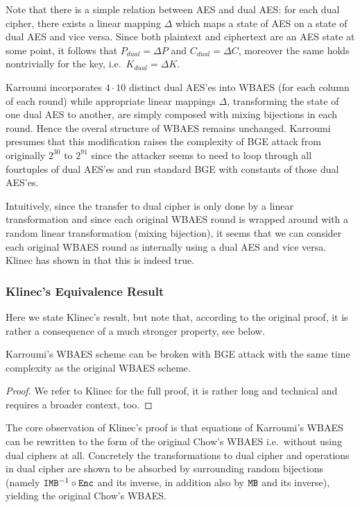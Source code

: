 	Note that there is a simple relation between AES and dual AES: for each dual cipher, there exists a linear mapping $\Delta$ which maps a state of AES on a state of dual AES and vice versa. Since both plaintext and ciphertext are an AES state at some point, it follows that $P_{dual} = \Delta P$ and $C_{dual} = \Delta C$, moreover the same holds nontrivially for the key, i.e.\ $K_{dual} = \Delta K$.
	
	Karroumi incorporates $4\cdot 10$ distinct dual AES'es into WBAES (for each column of each round) while appropriate linear mappings $\Delta$, transforming the state of one dual AES to another, are simply composed with mixing bijections in each round. Hence the overal structure of WBAES remains unchanged. Karroumi presumes that this modification raises the complexity of BGE attack from originally $2^{30}$ to $2^{91}$ since the attacker seems to need to loop through all fourtuples of dual AES'es and run standard BGE with constants of those dual AES'es.
	
	Intuitively, since the transfer to dual cipher is only done by a linear transformation and since each original WBAES round is wrapped around with a random linear transformation (mixing bijection), it seems that we can consider each original WBAES round as internally using a dual AES and vice versa. Klinec has shown in \cite[Proposition~2]{klinec2013white} that this is indeed true.

\subsubsection{Klinec's Equivalence Result}
	
	Here we state Klinec's result, but note that, according to the original proof, it is rather a consequence of a much stronger property, see below.
	
	\begin{prop}[Klinec]
	\label{thm:dualequiv}
		Karroumi's WBAES scheme can be broken with BGE attack with the same time complexity as the original WBAES scheme.
	\end{prop}
	
	\begin{proof}
		We refer to Klinec \cite{klinec2013white} for the full proof, it is rather long and technical and requires a broader context, too.
	\end{proof}
	
	\begin{remark}
	\label{rem:dualequiv}
		The core observation of Klinec's proof is that equations of Karroumi's WBAES can be rewritten to the form of the original Chow's WBAES i.e.\ without using dual ciphers at all. Concretely the transformations to dual cipher and operations in dual cipher are shown to be absorbed by surrounding random bijections (namely $\texttt{IMB}^{-1}\circ\texttt{Enc}$ and its inverse, in addition also by $\texttt{MB}$ and its inverse), yielding the original Chow's WBAES.
	\end{remark}
	
